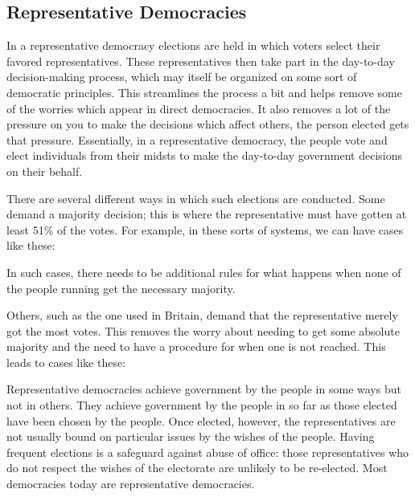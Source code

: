 \subsection{Representative Democracies}

In a representative democracy elections are held in which voters select their favored representatives. These representatives then take part in the day-to-day decision-making process, which may itself be organized on some sort of democratic principles. This streamlines the process a bit and helps remove some of the worries which appear in direct democracies. It also removes a lot of the pressure on you to make the decisions which affect others, the person elected gets that pressure. Essentially, in a representative democracy, the people vote and elect individuals from their midsts to make the day-to-day government decisions on their behalf.

There are several different ways in which such elections are conducted. Some demand a majority decision; this is where the representative must have gotten at least 51\% of the votes. For example, in these sorts of systems, we can have cases like these:


In such cases, there needs to be additional rules for what happens when none of the people running get the necessary majority.

Others, such as the one used in Britain, demand that the representative merely got the most votes. This removes the worry about needing to get some absolute majority and the need to have a procedure for when one is not reached. This leads to cases like these:


Representative democracies achieve government by the people in some ways but not in others. They achieve government by the people in so far as those elected have been chosen by the people. Once elected, however, the representatives are not usually bound on particular issues by the wishes of the people. Having frequent elections is a safeguard against abuse of office: those representatives who do not respect the wishes of the electorate are unlikely to be re-elected. Most democracies today are representative democracies.

